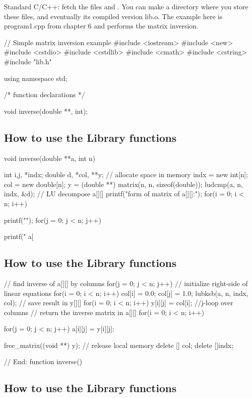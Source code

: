 \documentclass[%
twoside,                 %
final,                   %
10pt]{article}
\begin{document}
{{{{Standard C/C++: fetch the files  and . You can make a directory where you store
these files, and eventually its compiled version lib.o. The example here is program1.cpp from
chapter 6 and performs the matrix inversion.

\bcppcod
//  Simple matrix inversion example
#include <iostream>
#include <new>
#include <cstdio>
#include <cstdlib>
#include <cmath>
#include <cstring>
#include "lib.h"

using namespace std;

/* function declarations */

void inverse(double **, int);

\ecppcod

\subsection{How to use the Library functions}

\bcppcod
void inverse(double **a, int n)
{
  int          i,j, *indx;
  double       d, *col, **y;
  // allocate space in memory
  indx = new int[n];
  col  = new double[n];
  y    = (double **) matrix(n, n, sizeof(double));
  ludcmp(a, n, indx, &d);   // LU decompose  a[][]
  printf("\n\nLU form of matrix of a[][]:\n");
  for(i = 0; i < n; i++) {
    printf("\n");
    for(j = 0; j < n; j++) {
      printf(" a[%

\ecppcod

\subsection{How to use the Library functions}

\bcppcod
  // find inverse of a[][] by columns
  for(j = 0; j < n; j++) {
    // initialize right-side of linear equations
    for(i = 0; i < n; i++) col[i] = 0.0;
    col[j] = 1.0;
    lubksb(a, n, indx, col);
    // save result in y[][]
    for(i = 0; i < n; i++) y[i][j] = col[i];
  }   //j-loop over columns
  // return the inverse matrix in a[][]
  for(i = 0; i < n; i++) {
    for(j = 0; j < n; j++) a[i][j] = y[i][j];

  free_matrix((void **) y);     // release local memory
  delete [] col;
  delete []indx;
}  // End: function inverse()
\ecppcod

\subsection{How to use the Library functions}

}}}}}}}
\end{document}
